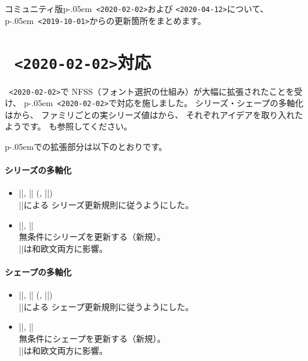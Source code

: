 \documentclass{plnews}
\author{日本語\TeX{}開発コミュニティ（\texttt{https://texjp.org/}）}
\def\pLaTeXe{p\kern-.05em\LaTeXe}
\begin{document}
\maketitle

コミュニティ版\pLaTeXe\ \texttt{<2020-02-02>}および
\texttt{<2020-04-12>}について、
\pLaTeXe\ \texttt{<2019-10-01>}からの更新箇所をまとめます。


\section{\LaTeXe\ \texttt{<2020-02-02>}対応}
\LaTeXe\ \texttt{<2020-02-02>}で
NFSS（フォント選択の仕組み）が大幅に拡張されたことを受け、
\pLaTeXe\ \texttt{<2020-02-02>}で対応を施しました。
シリーズ・シェープの多軸化はから、
ファミリごとの実シリーズ値はから、
それぞれアイデアを取り入れたようです。
も参照してください。

\pLaTeXe{}での拡張部分は以下のとおりです。

\paragraph{シリーズの多軸化}
\begin{itemize}
 \item |\kanjiseries|, |\romanseries| (, |\fontseries|)\\
   |\DeclareFontSeriesChangeRule|による
   シリーズ更新規則に従うようにした。
 \item |\kanjiseriesforce|, |\romanseriesforce|\\
   無条件にシリーズを更新する（新規）。\\
   |\fontseriesforce|は和欧文両方に影響。
\end{itemize}

\paragraph{シェープの多軸化}
\begin{itemize}
 \item |\kanjishape|, |\romanshape| (, |\fontshape|)\\
   |\DeclareFontShapeChangeRule|による
   シェープ更新規則に従うようにした。
 \item |\kanjishapeforce|, |\romanshapeforce|\\
   無条件にシェープを更新する（新規）。\\
   |\fontshapeforce|は和欧文両方に影響。
\end{itemize}
\end{document}
